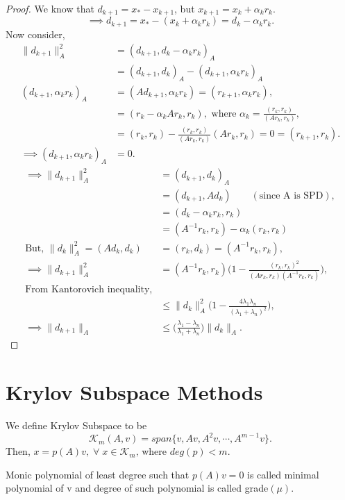 \documentclass[10pt,a4paper]{article}
\begin{document}
\begin{proof}
We know that $d_{k+1}=x_*-x_{k+1}$, but $x_{k+1}=x_k+\alpha_k r_k.$
$$\implies d_{k+1}=x_*-(x_k+\alpha_k r_k)=d_k-\alpha_k r_k.$$
Now consider,
\begin{align*}
\|d_{k+1}\|^2_A &= (d_{k+1},d_k-\alpha_k r_k)_A \\
&= (d_{k+1},d_k)_A-(d_{k+1},\alpha_k r_k)_A \\
(d_{k+1},\alpha_k r_k)_A &= (Ad_{k+1},\alpha_k r_k) = (r_{k+1},\alpha_k r_k), \\
&= (r_k-\alpha_kAr_k,r_k),\text{ where }\alpha_k=\frac{(r_k,r_k)}{(Ar_k,r_k)}, \\
&= (r_k,r_k)-\frac{(r_k,r_k)}{(Ar_k,r_k)}(Ar_k,r_k) = 0 = (r_{k+1},r_k). \\
\implies (d_{k+1},\alpha_k r_k)_A &= 0.
\end{align*}
\begin{align*}
\implies \|d_{k+1}\|^2_A &= (d_{k+1},d_k)_A \\
&= (d_{k+1},Ad_k) \qquad(\text{since A is SPD}),\\
&= (d_k-\alpha_k r_k,r_k) \\
&= (A^{-1}r_k,r_k)-\alpha_k(r_k,r_k) \\
\text{But, }\|d_k\|^2_A = (Ad_k,d_k) &= (r_k,d_k) = (A^{-1}r_k,r_k), \\
\implies \|d_{k+1}\|^2_A &= (A^{-1}r_k,r_k)\Big(1-\frac{(r_k,r_k)^2}{(Ar_k,r_k)(A^{-1}r_k,r_k)}\Big), \\
\text{From Kantorovich inequality,} \\
&\le \|d_{k}\|^2_A\Big(1-\frac{4\lambda_1\lambda_n}{(\lambda_1+\lambda_n)^2}\Big), \\
\implies \|d_{k+1}\|_A&\le\Big(\frac{\lambda_1-\lambda_n}{\lambda_1+\lambda_n}\Big)\|d_k\|_A.
\end{align*}
\end{proof}

\section{Krylov Subspace Methods}

We define Krylov Subspace to be 
$$\mathcal{K}_m(A,v)=span\{v,Av,A^2v,\cdots,A^{m-1}v\}.$$
Then, $x=p(A)v,\;\forall\;x\in\mathcal{K}_m\text{, where }deg(p)<m.$

\begin{definition}
Monic polynomial of least degree such that $p(A)v=0$ is called minimal polynomial of v and degree of such polynomial is called grade$(\mu)$.
\end{definition}
\end{document}
